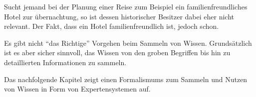 Sucht jemand bei der Planung einer Reise zum Beispiel ein familienfreundliches Hotel zur übernachtung, so ist dessen historischer Besitzer dabei eher nicht relevant. Der Fakt, dass ein Hotel familienfreundlich ist, jedoch schon.

Es gibt nicht ``das Richtige'' Vorgehen beim Sammeln von Wissen. Grundsätzlich ist es aber sicher sinnvoll, das Wissen von den groben Begriffen bis hin zu detaillierten Informationen zu sammeln.

Das nachfolgende Kapitel zeigt einen Formalismums zum Sammeln und Nutzen von Wissen in Form von Expertensystemen auf.
